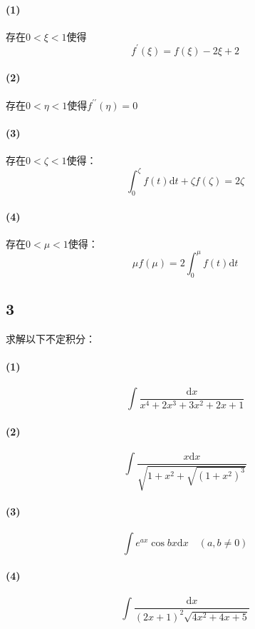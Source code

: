 \documentclass[a4paper,12pt]{article}
\begin{document}
\paragraph{(1)}存在$0<\xi<1$使得
\begin{equation*}
	f^{\prime}(\xi)=f(\xi)-2\xi+2
\end{equation*}
\paragraph{(2)}存在$0<\eta<1$使得$f^{\prime\prime}\left(\eta\right)=0$
\paragraph{(3)}存在$0<\zeta<1$使得：
\begin{equation*}
	\int_{0}^{\zeta}f(t)\mathrm{d}t+\zeta f(\zeta)=2\zeta
\end{equation*}
\paragraph{(4)}存在$0<\mu<1$使得：
\begin{equation*}
	\mu f(\mu)=2\int_{0}^{\mu}f(t)\mathrm{d}t
\end{equation*}
\subsection*{3}求解以下不定积分：
\paragraph{(1)}
\begin{equation*}
	\int \frac{\mathrm{d}x}{x^4+2x^3+3x^2+2x+1}
\end{equation*}
\paragraph{(2)}
\begin{equation*}
	\int \frac{x\mathrm{d}x}{\sqrt{1+x^2+\sqrt{\left(1+x^2\right)^3}}}
\end{equation*}
\paragraph{(3)}
\begin{equation*}
	\int e^{ax}\cos{bx}\mathrm{d}x\quad(a,b\neq 0)
\end{equation*}
\paragraph{(4)}
\begin{equation*}
	\int \frac{\mathrm{d}x}{(2x+1)^2\sqrt{4x^2+4x+5}}
\end{equation*}
\end{document}
